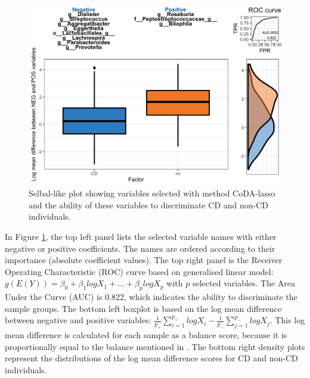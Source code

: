\documentclass[openany]{book}
\newenvironment{Shaded}{\begin{snugshade}}{\end{snugshade}}
\newcommand{\KeywordTok}[1]{\textcolor[rgb]{0.13,0.29,0.53}{\textbf{#1}}}
\newcommand{\DataTypeTok}[1]{\textcolor[rgb]{0.13,0.29,0.53}{#1}}
\newcommand{\StringTok}[1]{\textcolor[rgb]{0.31,0.60,0.02}{#1}}
\newcommand{\CommentTok}[1]{\textcolor[rgb]{0.56,0.35,0.01}{\textit{#1}}}
\newcommand{\OperatorTok}[1]{\textcolor[rgb]{0.81,0.36,0.00}{\textbf{#1}}}
\newcommand{\NormalTok}[1]{#1}
\begin{document}
\begin{figure}

{\centering \includegraphics[width=1\linewidth]{./Generated_plots/codaCD-1} 

}

\caption{Selbal-like plot showing variables selected with method CoDA-lasso and the ability of these variables to discriminate CD and non-CD individuals.}\label{fig:codaCD}
\end{figure}

In Figure \ref{fig:codaCD}, the top left panel lists the selected
variable names with either negative or positive coefficients. The names
are ordered according to their importance (absolute coefficient values).
The top right panel is the Receiver Operating Characteristic (ROC) curve
based on generalised linear model:
\(g(E(Y)) = \beta_{0} + \beta_{1}logX_{1}+...+\beta_{p}logX_{p}\) with
\(p\) selected variables. The Area Under the Curve (AUC) is 0.822, which
indicates the ability to discriminate the sample groups. The bottom left
boxplot is based on the log mean difference between negative and
positive variables:
\(\frac{1}{p_{+}}\sum_{i=1}^{p_{+}}logX_{i} - \frac{1}{p_{-}}\sum_{j=1}^{p_{-}}logX_{j}\).
This log mean difference is calculated for each sample as a balance
score, because it is proportionally equal to the balance mentioned in
\citep{rivera2018balances}. The bottom right density plots represent the
distributions of the log mean difference scores for CD and non-CD
individuals.

\begin{Shaded}
\end{Shaded}
\end{document}
